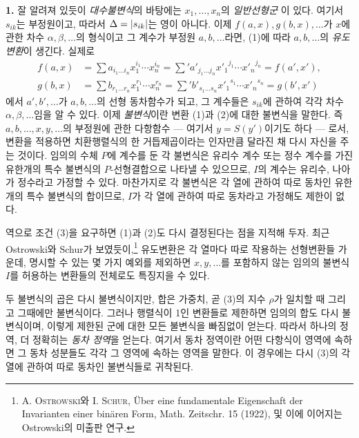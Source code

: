 \textbf{1.} 잘 알려져 있듯이 \emph{대수불변식}의 바탕에는 $x_1,\ldots,x_n$의 \emph{일반선형군}
이 있다. 여기서 $s_{ik}$는 부정원이고, 따라서 $\Delta=|s_{ik}|$는 영이 아니다. 이제 $f(a,x),g(b,x),\ldots$가 $x$에 관한 차수 $\alpha,\beta,\ldots$의 형식이고 그 계수가 부정원 $a,b,\ldots$라면, (1)에 따라 $a,b,\ldots$의 \emph{유도변환}이 생긴다. 실제로
\[
\begin{aligned}
f(a,x)&=\sum a_{i_1\ldots i_n}x_1^{i_1}\cdots x_n^{i_n}
      =\sum{}' a'_{j_1\ldots j_n}{x'_1}^{j_1}\cdots {x'_n}^{j_n}
      =f(a',x'),\\
g(b,x)&=\sum b_{r_1\ldots r_n}x_1^{r_1}\cdots x_n^{r_n}
      =\sum{}' b'_{s_1\ldots s_n}{x'_1}^{s_1}\cdots {x'_n}^{s_n}
      =g(b',x')
\end{aligned}
\]
에서 $a',b',\ldots$가 $a,b,\ldots$의 선형 동차함수가 되고, 그 계수들은 $s_{ik}$에 관하여 각각 차수 $\alpha,\beta,\ldots$임을 알 수 있다.
이제 \emph{불변식}이란 변환 (1)과 (2)에 대한 불변식을 말한다. 즉 $a,b,\ldots,x,y,\ldots$의 부정원에 관한 다항함수 --- 여기서 $y=S(y')$이기도 하다 --- 로서, 변환을 적용하면 치환행렬식의 한 거듭제곱이라는 인자만큼 달라진 채 다시 자신을 주는 것이다.
임의의 수체 $P$에 계수를 둔 각 불변식은 유리수 계수 또는 정수 계수를 가진 유한개의 특수 불변식의 $P$-선형결합으로 나타낼 수 있으므로, $I$의 계수는 유리수, 나아가 정수라고 가정할 수 있다. 마찬가지로 각 불변식은 각 열에 관하여 따로 동차인 유한개의 특수 불변식의 합이므로, $I$가 각 열에 관하여 따로 동차라고 가정해도 제한이 없다.

역으로 조건 (3)을 요구하면 (1)과 (2)도 다시 결정된다는 점을 지적해 두자. 최근 Ostrowski와 Schur가 보였듯이,\footnote{A. \textsc{Ostrowski}와 I. \textsc{Schur}, Über eine fundamentale Eigenschaft der Invarianten einer binären Form, Math. Zeitschr. 15 (1922), 및 이에 이어지는 Ostrowski의 미출판 연구.} 유도변환은 각 열마다 따로 작용하는 선형변환들 가운데, 명시할 수 있는 몇 가지 예외를 제외하면 $x,y,\ldots$를 포함하지 않는 임의의 불변식 $I$를 허용하는 변환들의 전체로도 특징지을 수 있다.

두 불변식의 곱은 다시 불변식이지만, 합은 가중치, 곧 (3)의 지수 $\rho$가 일치할 때 그리고 그때에만 불변식이다. 그러나 행렬식이 1인 변환들로 제한하면 임의의 합도 다시 불변식이며, 이렇게 제한된 군에 대한 모든 불변식을 빠짐없이 얻는다. 따라서 하나의 정역, 더 정확히는 \emph{동차 정역}을 얻는다. 여기서 동차 정역이란 어떤 다항식이 영역에 속하면 그 동차 성분들도 각각 그 영역에 속하는 영역을 말한다. 이 경우에는 다시 (3)의 각 열에 관하여 따로 동차인 불변식들로 귀착된다.

